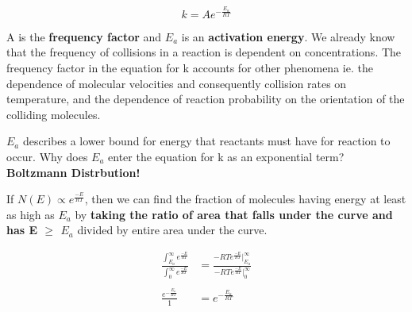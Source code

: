 \documentclass[12pt, letterpaper]{article}
\begin{document}
\begin{equation}
    k = Ae^{-\frac{E_a}{RT}}
\end{equation}

A is the \textbf{frequency factor} and $E_a$ is an \textbf{activation energy}. 
We already know that the frequency of collisions in a reaction is dependent on concentrations. 
The frequency factor in the equation for k accounts for other phenomena ie. the dependence of molecular
velocities and consequently collision rates on temperature, and the dependence of reaction probability on 
the orientation of the colliding molecules. 

\textbf{$E_a$} describes a lower bound for energy that reactants must have for reaction to occur. Why does $E_a$ 
enter the equation for k as an exponential term? \textbf{Boltzmann Distrbution!}

If \( N(E) \propto e^{\frac{-E}{RT}} \), then we can find the fraction of molecules having energy at least as high as $E_a$ by 
\textbf{taking the ratio of area that falls under the curve and has E $\geq$ $E_a$} divided by entire area under the curve. 

\begin{align*}
    \frac{\int_{E_a}^{\infty}  e^{\frac{-E}{RT}}}{\int_{0}^{\infty}  e^{\frac{-E}{RT}}} &= \frac{-RTe^{\frac{-E}{RT}} |_{E_a}^{\infty}}{-RTe^{\frac{-E}{RT}}|_{0}^{\infty}} \\ \\
    \frac{e^{-\frac{E_a}{RT}}}{1} &= e^{-\frac{E_a}{RT}}
\end{align*}
\end{document}
